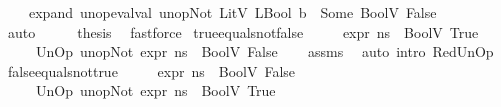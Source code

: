 \begin{isabellebody}
\ \ \ \ expand{}{\isacharcolon}{\kern0pt}\ {\isachardoublequoteopen}unop{\isacharunderscore}{\kern0pt}eval{\isacharunderscore}{\kern0pt}val\ unop{\isachardot}{\kern0pt}Not\ {\isacharparenleft}{\kern0pt}LitV\ {\isacharparenleft}{\kern0pt}LBool\ b{}{\isacharparenright}{\kern0pt}{\isacharparenright}{\kern0pt}\ {\isacharequal}{\kern0pt}\ Some\ {\isacharparenleft}{\kern0pt}BoolV\ False{\isacharparenright}{\kern0pt}{\isachardoublequoteclose}\isanewline
\ \ \ \ \isamarkupfalse%
\ auto\isanewline
\ \ \isamarkupfalse%
\ \isamarkupfalse%
\ {\isacharquery}{\kern0pt}thesis\ \isamarkupfalse%
\ fastforce\isanewline
{}\isamarkupfalse%
%
\endisatagproof
{\isafoldproof}%
%
\isadelimproof
\isanewline
%
\endisadelimproof
\isanewline
{}\isamarkupfalse%
\ true{\isacharunderscore}{\kern0pt}equals{\isacharunderscore}{\kern0pt}not{\isacharunderscore}{\kern0pt}false{\isacharcolon}{\kern0pt}\isanewline
\ \ \ {\isachardoublequoteopen}{\isasymLambda}{\isacharcomma}{\kern0pt}{\isasymGamma}{\isacharcomma}{\kern0pt}{\isasymOmega}\ {\isasymturnstile}\ {\isasymlangle}expr{\isacharcomma}{\kern0pt}\ ns{}{\isasymrangle}\ {\isasymDown}\ BoolV\ True{\isachardoublequoteclose}\isanewline
\ \ \ {\isachardoublequoteopen}{\isasymLambda}{\isacharcomma}{\kern0pt}{\isasymGamma}{\isacharcomma}{\kern0pt}{\isasymOmega}\ {\isasymturnstile}\ {\isasymlangle}UnOp\ unop{\isachardot}{\kern0pt}Not\ expr{\isacharcomma}{\kern0pt}\ ns{}{\isasymrangle}\ {\isasymDown}\ BoolV\ {\isacharparenleft}{\kern0pt}False{\isacharparenright}{\kern0pt}{\isachardoublequoteclose}\isanewline
%
\isadelimproof
\ \ %
\endisadelimproof
%
\isatagproof
{}\isamarkupfalse%
\ assms\ \isamarkupfalse%
\ {\isacharparenleft}{\kern0pt}auto\ intro{\isacharcolon}{\kern0pt}\ RedUnOp{\isacharparenright}{\kern0pt}%
\endisatagproof
{\isafoldproof}%
%
\isadelimproof
\isanewline
%
\endisadelimproof
\isanewline
{}\isamarkupfalse%
\ false{\isacharunderscore}{\kern0pt}equals{\isacharunderscore}{\kern0pt}not{\isacharunderscore}{\kern0pt}true{\isacharcolon}{\kern0pt}\isanewline
\ \ \ {\isachardoublequoteopen}{\isasymLambda}{\isacharcomma}{\kern0pt}{\isasymGamma}{\isacharcomma}{\kern0pt}{\isasymOmega}\ {\isasymturnstile}\ {\isasymlangle}expr{\isacharcomma}{\kern0pt}\ ns{}{\isasymrangle}\ {\isasymDown}\ BoolV\ False{\isachardoublequoteclose}\isanewline
\ \ \ {\isachardoublequoteopen}{\isasymLambda}{\isacharcomma}{\kern0pt}{\isasymGamma}{\isacharcomma}{\kern0pt}{\isasymOmega}\ {\isasymturnstile}\ {\isasymlangle}UnOp\ unop{\isachardot}{\kern0pt}Not\ expr{\isacharcomma}{\kern0pt}\ ns{}{\isasymrangle}\ {\isasymDown}\ BoolV\ {\isacharparenleft}{\kern0pt}True{\isacharparenright}{\kern0pt}{\isachardoublequoteclose}\isanewline

\end{isabellebody}
